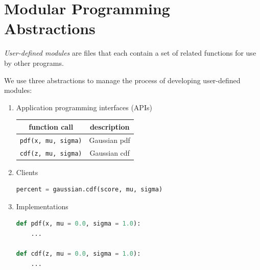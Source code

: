 \documentclass[8pt,a4paper,compress,handout]{beamer}
\begin{document}
\section{Modular Programming Abstractions}
\begin{frame}[fragile]
\emph{User-defined modules} are files that each contain a set of related functions for use by other programs.

\bigskip

We use three abstractions to manage the process of developing user-defined modules:
\begin{enumerate}
\item Application programming interfaces (APIs)
\begin{center}
\begin{tabular}{cc}
function call & description \\ \hline
\lstinline$pdf(x, mu, sigma)$ & Gaussian pdf \\
\lstinline$cdf(z, mu, sigma)$ & Gaussian cdf \\
\end{tabular} 
\end{center}

\item Clients
\begin{lstlisting}[language=Python]
percent = gaussian.cdf(score, mu, sigma)
\end{lstlisting}

\item Implementations
\begin{lstlisting}[language=Python]
def pdf(x, mu = 0.0, sigma = 1.0):
    ...
    
def cdf(z, mu = 0.0, sigma = 1.0):
    ...
\end{lstlisting}
\end{enumerate}
\end{frame}
\end{document}
